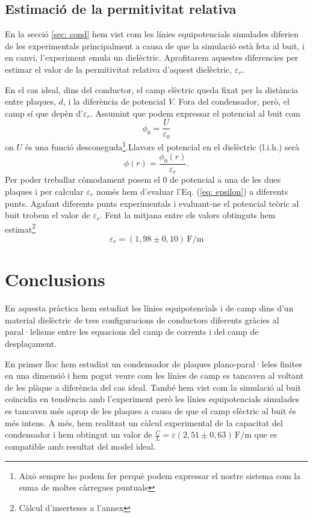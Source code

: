 \documentclass[11pt]{article}
\begin{document}
\subsection{Estimació de la permitivitat relativa}
En la secció \ref{sec: cond} hem vist com les línies equipotencials simulades diferien de les experimentals principalment a causa de que la simulació està feta al buit, i en canvi, l'experiment emula un dielèctric. Aprofitarem aquestes diferencies per estimar el valor de la permitivitat relativa d'aquest dielèctric, $\varepsilon_r$.

En el cas ideal, dins del conductor, el camp elèctric queda fixat per la distància entre plaques, $d$, i la diferència de potencial $V$. Fora del condensador, però, el camp sí que depèn d'$\varepsilon_r$. 
Assumint que podem expressar el potencial al buit com 
\begin{equation}
    \phi_0 = \frac{U}{\varepsilon_0}
\end{equation} 
on $U$ és una funció desconeguda\footnote{Això sempre ho podem fer perquè podem expressar el nostre sistema com la suma de moltes càrregues puntuals}.Llavors el potencial en el dielèctric (l.i.h.) serà
\begin{equation}
    \phi(r)=\frac{\phi_0(r)}{\varepsilon_r}.
    \label{eq: epsilon}
\end{equation} 
Per poder treballar còmodament posem el 0 de potencial a una de les dues plaques i per calcular $\varepsilon_r$ només hem d'evaluar l'Eq. (\ref{eq: epsilon}) a diferents punts. Agafant diferents punts experimentals i evaluant-ne el potencial teòric al buit trobem el valor de $\varepsilon_r$. Fent la mitjana entre els valors obtinguts hem estimat\footnote{Càlcul d'inserteses a l'annex}
\begin{equation}
    \varepsilon_r=(1,98 \pm 0,10)\, \mathrm{F/m}
\end{equation}

\section{Conclusions}\label{sec: conc}

En aquesta pràctica hem estudiat les línies equipotencials i de camp dins d'un material dielèctric de tres configuracions de conductors diferents gràcies al paral·lelisme entre les equacions del camp de corrents i del camp de desplaçament. 

En primer lloc hem estudiat un condensador de plaques plano-paral·leles finites en una dimensió i hem pogut veure com les línies de camp es tancaven al voltant de les plàque a diferència del cas ideal. També hem vist com la simulació al buit coïncidia en tendència amb l'experiment però les línies equipotencials simulades es tancaven més aprop de les plaques a causa de que el camp elèctric al buit és més intens. A més, hem realitzat un càlcul experimental de la capacitat del condensador i hem obtingut un valor de $ \frac{C}{L} = \varepsilon  (2{,}51 \pm 0{,}63)\, \mathrm{F/m} $ que es compatible amb resultat del model ideal.
\end{document}
